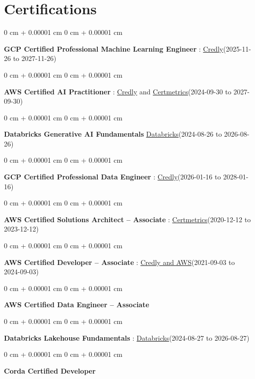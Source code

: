 \documentclass[10pt, letterpaper]{article}
\newenvironment{onecolentry}{
    \begin{adjustwidth}{
        0 cm + 0.00001 cm
    }{
        0 cm + 0.00001 cm
    }
}{
    \end{adjustwidth}
} %
\begin{document}
    \vspace{2 pt }
    \section{Certifications}
        \vspace{2 pt }
        \begin{samepage}
            \begin{onecolentry}
                \textbf{GCP Certified Professional Machine Learning Engineer} : \href{https://www.credly.com/badges/a6965347-09ea-4d8f-b398-0e151407160d/public_url}{Credly}(2025-11-26 to 2027-11-26)
            \end{onecolentry}
            \begin{onecolentry}
                \textbf{AWS Certified AI Practitioner} : \href{https://www.credly.com/badges/451b7ba5-8be1-4a8e-bbec-ade26627a6b6/public_url}{Credly} and \href{https://cp.certmetrics.com/amazon/en/public/verify/credential/495f0d9853874bf9a33c17f8e89ce131}{Certmetrics}(2024-09-30 to 2027-09-30)
            \end{onecolentry}
            \begin{onecolentry}
                \textbf{Databricks Generative AI Fundamentals} \href{https://sgq.io/3uIFGNi}{Databricks}(2024-08-26 to 2026-08-26)
            \end{onecolentry}
            \begin{onecolentry}
                \textbf{GCP Certified Professional Data Engineer} : \href{https://www.credly.com/badges/977e96d9-12e7-4f6c-b8a7-df71fb7153b8/public_url}{Credly}(2026-01-16 to 2028-01-16)
            \end{onecolentry}
            \begin{onecolentry}
                \textbf{AWS Certified Solutions Architect – Associate} : \href{https://cp.certmetrics.com/amazon/en/public/verify/credential/SNBY48EBJJVE1SWX}{Certmetrics}(2020-12-12 to 2023-12-12)
            \end{onecolentry}
            \begin{onecolentry}
                \textbf{AWS Certified Developer – Associate} : \href{https://www.credly.com/badges/b8106fbd-d3d1-4204-8cdf-e708798fd582/public_url}{Credly and AWS}(2021-09-03  to 2024-09-03)
            \end{onecolentry}
            \begin{onecolentry}
                \textbf{AWS Certified Data Engineer – Associate}
            \end{onecolentry}
            \begin{onecolentry}
                \textbf{Databricks Lakehouse Fundamentals} : \href{https://scl.io/FXGKS0u}{Databricks}(2024-08-27 to 2026-08-27)
            \end{onecolentry}
            \begin{onecolentry}
                \textbf{Corda Certified Developer}
            \end{onecolentry}
        \end{samepage}
\end{document}
